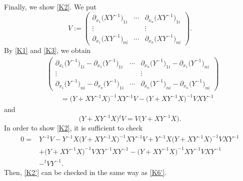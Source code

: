 \documentclass[10pt,a4paper]{amsart}
\numberwithin{equation}{section}
\begin{document}
Finally, we show \eqref{K2}. We put
\[
V:=
\begin{pmatrix}
\partial_{x_1}\bigl(XY^{-1}\bigr)_{1i} & \cdots & \partial_{x_n}\bigl(XY^{-1}\bigr)_{1i} \\
\vdots & & \vdots \\
\partial_{x_1}\bigl(XY^{-1}\bigr)_{ni} & \cdots & \partial_{x_n}\bigl(XY^{-1}\bigr)_{ni}
\end{pmatrix}.
\]
By \eqref{K1} and \eqref{K3}, we obtain
\begin{align*}
&\begin{pmatrix}
\partial_{x_1}\bigl(Y^{-1}\bigr)_{1i}-\partial_{x_1}\bigl(Y^{-1}\bigr)_{1i} & \cdots & \partial_{x_n}\bigl(Y^{-1}\bigr)_{1i}-\partial_{x_1}\bigl(Y^{-1}\bigr)_{ni} \\
\vdots & & \vdots \\
\partial_{x_1}\bigl(Y^{-1}\bigr)_{ni}-\partial_{x_n}\bigl(Y^{-1}\bigr)_{1i} & \cdots & \partial_{x_n}\bigl(Y^{-1}\bigr)_{ni}-\partial_{x_n}\bigl(Y^{-1}\bigr)_{ni}
\end{pmatrix}\\
&\qquad=\bigl(Y+XY^{-1}X\bigr)^{-1}XY^{-1}V-\bigl(Y+XY^{-1}X\bigr)^{-1}VXY^{-1}
\end{align*}
and
\[
\bigl(Y+XY^{-1}X\bigr){}^tV=V\bigl(Y+XY^{-1}X\bigr).
\]
In order to show \eqref{K2}, it is sufficient to check
\begin{align}
0={}&Y^{-1}V-Y^{-1}X\bigl(Y+XY^{-1}X\bigr)^{-1}XY^{-1}V+Y^{-1}X\bigl(Y+XY^{-1}X\bigr)^{-1}VXY^{-1}\nonumber\\
&+\bigl(Y+XY^{-1}X\bigr)^{-1}VXY^{-1}XY^{-1}-\bigl(Y+XY^{-1}X\bigr)^{-1}XY^{-1}VXY^{-1}\nonumber\\
&-{}^tVY^{-1}.\label{K2'}
\end{align}
Then, \eqref{K2'} can be checked in the same way as \eqref{K6'}.
\end{document}
